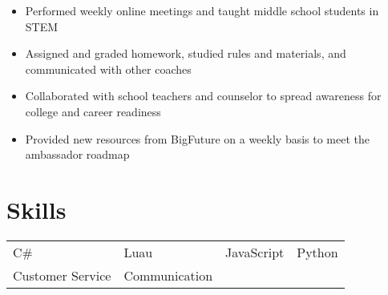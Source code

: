 \documentclass{my_cv} %
\begin{document}
\begin{itemize}
    \item Performed weekly online meetings and taught middle school students in STEM
    \item Assigned and graded homework, studied rules and materials, and communicated with other coaches
\end{itemize}

\begin{itemize}
    \item Collaborated with school teachers and counselor to spread awareness for college and career readiness
    \item Provided new resources from BigFuture on a weekly basis to meet the ambassador roadmap
\end{itemize}

\section{Skills}
\begin{tabular}{l l l l}
C\# & Luau & JavaScript & Python \\
Customer Service & Communication
\end{tabular}
\end{document}
